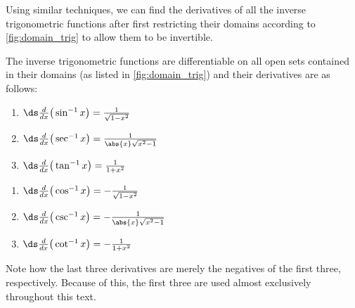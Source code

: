 Using similar techniques, we can find the derivatives of all the inverse trig\-o\-no\-metric functions after first restricting their domains according to \autoref{fig:domain_trig} to allow them to be invertible.

{The inverse trigonometric functions are differentiable on all open sets contained in their domains (as listed in \autoref{fig:domain_trig}) and their derivatives are as follows:\\
\begin{minipage}{.5\specialboxlength}\small
	\begin{enumerate}
		\item	$\ds\frac d{dx}\big(\sin^{-1}x\big)= \frac1{\sqrt{1-x^2}}$ 
		\item	$\ds\frac d{dx}\big(\sec^{-1}x\big)= \frac1{\abs{x}\sqrt{x^2-1}}$
		\item	$\ds\frac d{dx}\big(\tan^{-1}x\big)= \frac1{1+x^2}$
	\end{enumerate}
	\end{minipage}%
	\begin{minipage}{.5\specialboxlength}\small
	\begin{enumerate}\addtocounter{enumi}{3}
		\item	$\ds\frac d{dx}\big(\cos^{-1}x\big)=-\frac1{\sqrt{1-x^2}}$ 
		\item	$\ds\frac d{dx}\big(\csc^{-1}x\big)=-\frac1{\abs{x}\sqrt{x^2-1}}$
		\item	$\ds\frac d{dx}\big(\cot^{-1}x\big)=-\frac1{1+x^2}$
	\end{enumerate}
	\normalsize
\end{minipage}}			

Note how the last three derivatives are merely the negatives of the first three, respectively. Because of this, the first three are used almost exclusively throughout this text.

%

